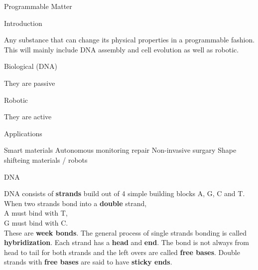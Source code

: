 \documentclass[12pt, letterpaper]{article}
\begin{document}
\newpage

\begin{section}{Programmable Matter}

  \begin{subsection}{Introduction}

    Any substance that can change its physical properties in a programmable
    fashion. This will mainly include DNA assembly and cell evolution as well
    as robotic.

    \begin{subsubsection}{Biological (DNA)}

      They are passive

    \end{subsubsection}

    \begin{subsubsection}{Robotic}

      They are active

    \end{subsubsection}

    \begin{subsubsection}{Applications}

      Smart materials
      Autonomous monitoring repair
      Non-invasive surgary
      Shape shifteing materials / robots

    \end{subsubsection}

  \end{subsection}

  \newpage

  \begin{subsection}{DNA}

    DNA consists of \textbf{strands} build out of 4 simple building blocks
    A, G, C and T. When two strands bond into a \textbf{double} strand, \\ A
    must bind with T, \\ G must bind with C. \\ These are \textbf{week bonds}.
    The general process of single strands bonding is called
    \textbf{hybridization}. Each strand has a \textbf{head} and \textbf{end}.
    The bond is not always from head to tail for both strands and the left
    overs are called \textbf{free bases}. Double strands with
    \textbf{free bases} are said to have \textbf{sticky ends}.


\end{subsection}
\end{section}
\end{document}
